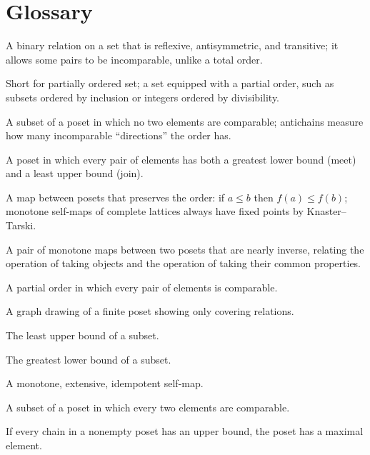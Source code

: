 \section*{Glossary}
\begin{description}[leftmargin=*,style=nextline,itemsep=0.3em]
\item[\textbf{Partial order.}] A binary relation on a set that is reflexive, antisymmetric, and transitive; it allows some pairs to be incomparable, unlike a total order.
\item[\textbf{Poset.}] Short for partially ordered set; a set equipped with a partial order, such as subsets ordered by inclusion or integers ordered by divisibility.
\item[\textbf{Antichain.}] A subset of a poset in which no two elements are comparable; antichains measure how many incomparable ``directions'' the order has.
\item[\textbf{Lattice.}] A poset in which every pair of elements has both a greatest lower bound (meet) and a least upper bound (join).
\item[\textbf{Monotone function.}] A map between posets that preserves the order: if $a\leq b$ then $f(a)\leq f(b)$; monotone self-maps of complete lattices always have fixed points by Knaster--Tarski.
\item[\textbf{Galois connection.}] A pair of monotone maps between two posets that are nearly inverse, relating the operation of taking objects and the operation of taking their common properties.
\item[\textbf{Total order.}] A partial order in which every pair of elements is comparable.
\item[\textbf{Hasse diagram.}] A graph drawing of a finite poset showing only covering relations.
\item[\textbf{Supremum (join).}] The least upper bound of a subset.
\item[\textbf{Infimum (meet).}] The greatest lower bound of a subset.
\item[\textbf{Closure operator.}] A monotone, extensive, idempotent self-map.
\item[\textbf{Chain.}] A subset of a poset in which every two elements are comparable.
\item[\textbf{Zorn's lemma.}] If every chain in a nonempty poset has an upper bound, the poset has a maximal element.
\end{description}

